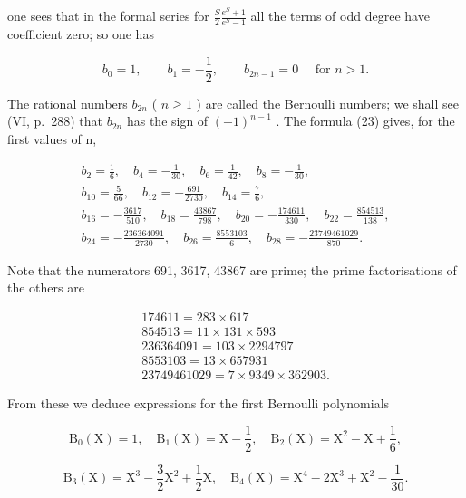 one sees that in the formal series for \(\frac{S}{2}\frac{e^{S}+1}{e^{S}-1}\) all the terms of odd degree have coefficient zero; so one has

\[
b _ {0} = 1, \qquad b _ {1} = - \frac {1}{2}, \qquad b _ {2 n - 1} = 0 \quad \text { for } n > 1.\tag{24}
\]

The rational numbers \(b_{2n}\) ( \(n \geqslant 1\) ) are called the Bernoulli numbers; we shall see (VI, p.~288) that \(b_{2n}\) has the sign of \((-1)^{n-1}\) . The formula (23) gives, for the first values of n,

\[
\begin{array}{c} b _ {2} = \frac {1}{6}, \quad b _ {4} = - \frac {1}{3 0}, \quad b _ {6} = \frac {1}{4 2}, \quad b _ {8} = - \frac {1}{3 0}, \\ b _ {1 0} = \frac {5}{6 6}, \quad b _ {1 2} = - \frac {6 9 1}{2 7 3 0}, \quad b _ {1 4} = \frac {7}{6}, \\ b _ {1 6} = - \frac {3 6 1 7}{5 1 0}, \quad b _ {1 8} = \frac {4 3 8 6 7}{7 9 8}, \quad b _ {2 0} = - \frac {1 7 4 6 1 1}{3 3 0}, \quad b _ {2 2} = \frac {8 5 4 5 1 3}{1 3 8}, \\ b _ {2 4} = - \frac {2 3 6 3 6 4 0 9 1}{2 7 3 0}, \quad b _ {2 6} = \frac {8 5 5 3 1 0 3}{6}, \quad b _ {2 8} = - \frac {2 3 7 4 9 4 6 1 0 2 9}{8 7 0}. \end{array}
\]

Note that the numerators 691, 3617, 43867 are prime; the prime factorisations of the others are

\[
\begin{array}{c} 1 7 4 6 1 1 = 2 8 3 \times 6 1 7 \\ 8 5 4 5 1 3 = 1 1 \times 1 3 1 \times 5 9 3 \\ 2 3 6 3 6 4 0 9 1 = 1 0 3 \times 2 2 9 4 7 9 7 \\ 8 5 5 3 1 0 3 = 1 3 \times 6 5 7 9 3 1 \\ 2 3 7 4 9 4 6 1 0 2 9 = 7 \times 9 3 4 9 \times 3 6 2 9 0 3. \end{array}
\]

From these we deduce expressions for the first Bernoulli polynomials

\[
\mathrm{B} _ {0} (\mathrm{X}) = 1, \quad \mathrm{B} _ {1} (\mathrm{X}) = \mathrm{X} - \frac {1}{2}, \quad \mathrm{B} _ {2} (\mathrm{X}) = \mathrm{X} ^ {2} - \mathrm{X} + \frac {1}{6},
\]

\[
\mathrm{B} _ {3} (\mathrm{X}) = \mathrm{X} ^ {3} - \frac {3}{2} \mathrm{X} ^ {2} + \frac {1}{2} \mathrm{X}, \quad \mathrm{B} _ {4} (\mathrm{X}) = \mathrm{X} ^ {4} - 2 \mathrm{X} ^ {3} + \mathrm{X} ^ {2} - \frac {1}{3 0}.
\]

